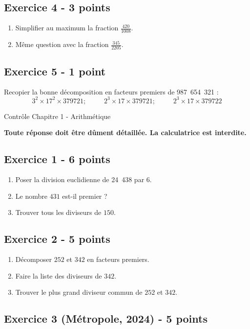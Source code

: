 \documentclass[14 pt]{extarticle}
\theoremstyle{plain}
\begin{document}
 \subsection*{Exercice 4 - 3 points}
 \begin{enumerate}
 \item 
 Simplifier au maximum la fraction $\frac{420}{1008}$.
 \item 
 Même question avec la fraction $\frac{345}{2205}$.
 \end{enumerate}
 \subsection*{Exercice 5 - 1 point}
  Recopier la bonne décomposition en facteurs premiers de 987~654~321 : 
  \[ 3^2\times 17^2\times 379721 ;\phantom{meow} 2^3 \times 17 \times 379721 ;\phantom{meow} 2^3 \times 17 \times 379722 \]
 \newpage\begin{center}{\Large Contrôle Chapitre 1 - Arithmétique}\\ 
 \end{center} 
 
 \textbf{Toute réponse doit être dûment détaillée. La calculatrice est interdite.}
\subsection*{Exercice 1 - 6 points} 
 
 \begin{enumerate}
 \item Poser la division euclidienne de 24~438 par 6. 
 \item Le nombre $431$ est-il premier ? 
 \item Trouver tous les diviseurs de $150$. 
 \end{enumerate}
 
\subsection*{Exercice 2 - 5 points} 
\begin{enumerate}
\item Décomposer $252$ et $342$ en facteurs premiers. 
\item Faire la liste des diviseurs de $342$. 
\item Trouver le plus grand diviseur commun de $252$ et $342$.
\end{enumerate} 

 
 \subsection*{Exercice 3 (Métropole, 2024) - 5 points}
 
\end{document}

